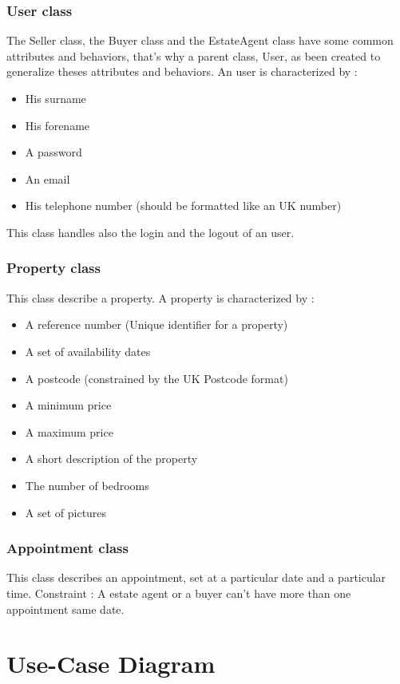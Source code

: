 \documentclass[a4paper,12pt]{article}
\begin{document}
\subsubsection{User class}
The Seller class, the Buyer class and the EstateAgent class have some common attributes and behaviors,
that's why a parent class, User, as been created to generalize theses attributes and behaviors.
An user is characterized by :
\begin{itemize}
\item His surname
\item His forename
\item A password
\item An email
\item His telephone number (should be formatted like an UK number)
\end{itemize}
This class handles also the login and the logout of an user.

\subsubsection{Property class}
This class describe a property. A property is characterized by : 
\begin{itemize}
\item A reference number (Unique identifier for a property)
\item A set of availability dates
\item A postcode (constrained by the UK Postcode format)
\item A minimum price
\item A maximum price
\item A short description of the property
\item The number of bedrooms
\item A set of pictures
\end{itemize}

\subsubsection{Appointment class}
This class describes an appointment, set at a particular date and a particular time.
Constraint : A estate agent or a buyer can't have more than one appointment same date.



\section{Use-Case Diagram}
\end{document}
